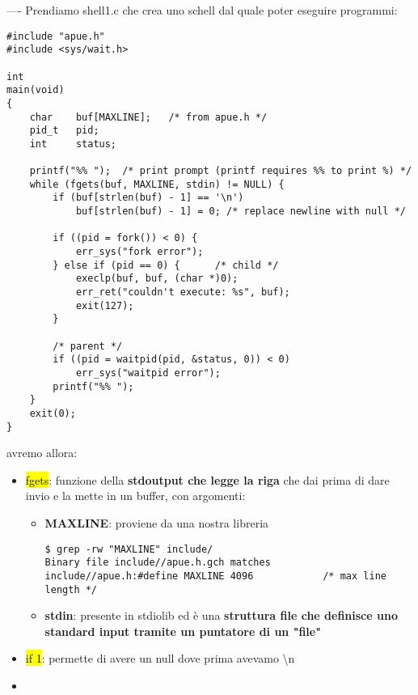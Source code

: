 ----
Prendiamo shell1.c che crea uno schell dal quale poter eseguire programmi:

\begin{lstlisting}
#include "apue.h"
#include <sys/wait.h>

int
main(void)
{
	char	buf[MAXLINE];	/* from apue.h */
	pid_t	pid;
	int		status;

	printf("%% ");	/* print prompt (printf requires %% to print %) */
	while (fgets(buf, MAXLINE, stdin) != NULL) {
		if (buf[strlen(buf) - 1] == '\n')
			buf[strlen(buf) - 1] = 0; /* replace newline with null */

		if ((pid = fork()) < 0) {
			err_sys("fork error");
		} else if (pid == 0) {		/* child */
			execlp(buf, buf, (char *)0);
			err_ret("couldn't execute: %s", buf);
			exit(127);
		}

		/* parent */
		if ((pid = waitpid(pid, &status, 0)) < 0)
			err_sys("waitpid error");
		printf("%% ");
	}
	exit(0);
}
\end{lstlisting}

avremo allora:

\begin{itemize}
	\item \hl{fgets}: funzione della \textbf{stdoutput che legge la riga} che dai prima di dare invio e la mette in un buffer, con argomenti:
	
		\begin{itemize}
			\item \textbf{MAXLINE}: proviene da una nostra libreria

\begin{lstlisting}
$ grep -rw "MAXLINE" include/
Binary file include//apue.h.gch matches
include//apue.h:#define	MAXLINE	4096			/* max line length */
\end{lstlisting}

			\item \textbf{stdin}: presente in stdiolib ed è una \textbf{struttura file che definisce uno standard input tramite un puntatore di un "file"}
		\end{itemize}

	\item \hl{if 1}: permette di avere un null dove prima avevamo \textbackslash n
	
	\item 
\end{itemize}